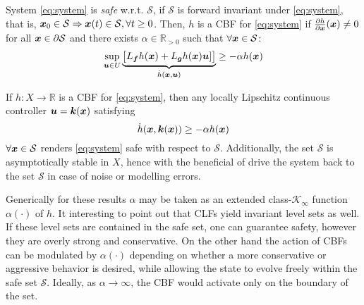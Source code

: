 \begin{definition} System \eqref{eq:system} is \textit{safe} w.r.t. $\mathcal{S}$, if $\mathcal{S}$ is forward invariant under \eqref{eq:system}, that is, $\boldsymbol{x}_0\in\mathcal{S}\Rightarrow \boldsymbol{x}(t)\in\mathcal{S}, \forall t\geq0$.
Then, $h$ is a CBF for \eqref{eq:system} if $\frac{\partial{h}}{\partial \boldsymbol{x}} (\boldsymbol{x})\neq 0$ for all $\boldsymbol{x}\in \partial{\mathcal{S}}$ and there exists $\alpha \in \mathbb{R}_{>0}$ such that $\forall \boldsymbol{x} \in \mathcal{S}$: 
\begin{equation}
\sup_{\boldsymbol{u}\in U} \underbrace{ 
\begin{bmatrix}
L_{\boldsymbol{f}}h(\boldsymbol{x}) + L_{\boldsymbol{g}}h(\boldsymbol{x})\boldsymbol{u}] 
\end{bmatrix}}_{\dot{h}(\boldsymbol{x},\boldsymbol{u})}\geq -\alpha h(\boldsymbol{x})
\end{equation}


\begin{theorem}
    \label{theorem1}If $h : X \to \mathbb{R}$ is a CBF for \eqref{eq:system}, then any locally Lipschitz continuous controller $\boldsymbol{u} = \boldsymbol{k}(\boldsymbol{x})$ satisfying
\begin{equation}
\dot{h}(\boldsymbol{x},\boldsymbol{k}(\boldsymbol{x}))\geq -\alpha h(\boldsymbol{x})
\label{cond:2}
\end{equation}
$\forall{\boldsymbol{x}}\in\mathcal{S}$ renders \eqref{eq:system} safe with respect to $\mathcal{S}$. Additionally, the set $\mathcal{S}$ is asymptotically stable in $X$, hence with the beneficial of drive the system back to the set $\mathcal{S}$ in case of noise or modelling errors.
\end{theorem}
\end{definition}
\noindent
Generically for these results $\alpha$ may be taken as an extended class-$\mathcal{K}_{\infty}$ function $\alpha(\cdot)$ of $h$.
It interesting to point out that CLFs yield invariant level sets as well. If these level sets are contained in the safe set, one can guarantee safety, however they are overly strong and conservative. On the other hand the action of CBFs can be modulated by $\alpha(\cdot)$ depending on whether a more conservative or aggressive behavior is desired, while allowing the state to evolve freely within the safe set $\mathcal{S}$. Ideally, as $\alpha \to \infty$, the CBF would activate only on the boundary of the set.


